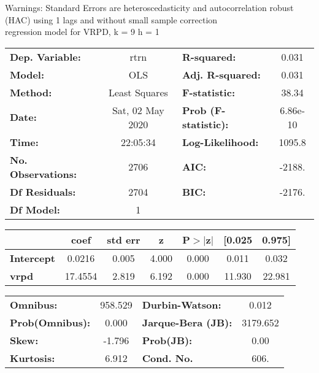 Warnings: \newline
 [1] Standard Errors are heteroscedasticity and autocorrelation robust (HAC) using 1 lags and without small sample correction\\ 

regression model for VRPD, k = 9 h = 1\begin{center}
\begin{tabular}{lclc}
\toprule
\textbf{Dep. Variable:}    &       rtrn       & \textbf{  R-squared:         } &     0.031   \\
\textbf{Model:}            &       OLS        & \textbf{  Adj. R-squared:    } &     0.031   \\
\textbf{Method:}           &  Least Squares   & \textbf{  F-statistic:       } &     38.34   \\
\textbf{Date:}             & Sat, 02 May 2020 & \textbf{  Prob (F-statistic):} &  6.86e-10   \\
\textbf{Time:}             &     22:05:34     & \textbf{  Log-Likelihood:    } &    1095.8   \\
\textbf{No. Observations:} &        2706      & \textbf{  AIC:               } &    -2188.   \\
\textbf{Df Residuals:}     &        2704      & \textbf{  BIC:               } &    -2176.   \\
\textbf{Df Model:}         &           1      & \textbf{                     } &             \\
\bottomrule
\end{tabular}
\begin{tabular}{lcccccc}
                   & \textbf{coef} & \textbf{std err} & \textbf{z} & \textbf{P$> |$z$|$} & \textbf{[0.025} & \textbf{0.975]}  \\
\midrule
\textbf{Intercept} &       0.0216  &        0.005     &     4.000  &         0.000        &        0.011    &        0.032     \\
\textbf{vrpd}      &      17.4554  &        2.819     &     6.192  &         0.000        &       11.930    &       22.981     \\
\bottomrule
\end{tabular}
\begin{tabular}{lclc}
\textbf{Omnibus:}       & 958.529 & \textbf{  Durbin-Watson:     } &    0.012  \\
\textbf{Prob(Omnibus):} &   0.000 & \textbf{  Jarque-Bera (JB):  } & 3179.652  \\
\textbf{Skew:}          &  -1.796 & \textbf{  Prob(JB):          } &     0.00  \\
\textbf{Kurtosis:}      &   6.912 & \textbf{  Cond. No.          } &     606.  \\
\bottomrule
\end{tabular}
\end{center}

